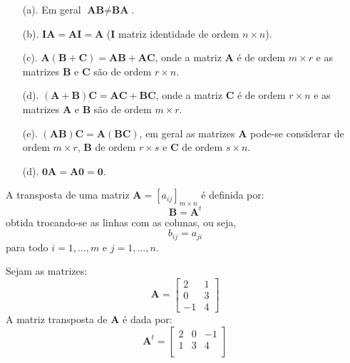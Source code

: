 \begin{itemize}
	\item[(a).] Em geral $\textbf{A}\textbf{B}\neq \textbf{B}\textbf{A}$.
	\item[(b).] $\textbf{I}\textbf{A}=\textbf{A}\textbf{I}=\textbf{A}$ ($\textbf{I}$ matriz identidade de ordem $n\times n$).
	\item[(c).] $\textbf{A}(\textbf{B}+\textbf{C})=\textbf{A}\textbf{B}+\textbf{A}\textbf{C}$, onde a matriz $\textbf{A}$ é de ordem $m\times r$ e as matrizes $\textbf{B}$ e $\textbf{C}$ são de ordem $r \times n$.
	\item[(d).] $(\textbf{A}+\textbf{B})\textbf{C}=\textbf{A}\textbf{C}+\textbf{B}\textbf{C}$, onde a matriz $\textbf{C}$ é de ordem $r\times n$ e as matrizes $\textbf{A}$ e $\textbf{B}$ são de ordem $m \times r$.
	\item[(e).] $(\textbf{A}\textbf{B})\textbf{C}=\textbf{A}(\textbf{B}\textbf{C})$, em geral as matrizes $\textbf{A}$ pode-se considerar de ordem $m\times r$, $\textbf{B}$ de ordem $r\times s$ e $\textbf{C}$ de ordem $s\times n$.
	\item[(d).] $\textbf{0}\textbf{A}=\textbf{A}\textbf{0}=\textbf{0}$.
\end{itemize}
\begin{df}
	A transposta de uma matriz $\textbf{A}=[a_{ij}]_{m\times n}$ é definida por:
	\begin{equation*}
	\textbf{B}=\textbf{A}^{t}
	\end{equation*}
	obtida trocando-se as linhas com as colunas, ou seja,
	\begin{equation*}
	b_{ij}=a_{ji}
	\end{equation*}
	para todo $i=1,...,m$ e $j=1,...,n$.
\end{df}
\begin{ex}
	Sejam as matrizes:\\
	\begin{equation*}
	\textbf{A}=\begin{bmatrix}
	2   & 1\\
	0   & 3\\
	-1   &  4
	\end{bmatrix}  
	\end{equation*} 
	A matriz transposta de $\textbf{A}$ é dada por:
	\begin{equation*}
	\textbf{A}^{t}=\begin{bmatrix}
	2   & 0 & -1\\
	1   & 3 & 4\\
	\end{bmatrix}  
	\end{equation*}	
\end{ex}

